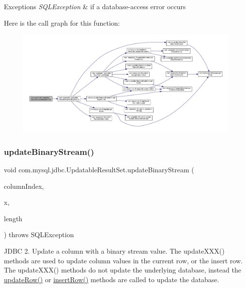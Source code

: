 \begin{DoxyExceptions}{Exceptions}
{\em S\+Q\+L\+Exception} & if a database-\/access error occurs \\
\hline
\end{DoxyExceptions}
Here is the call graph for this function\+:
\nopagebreak
\begin{figure}[H]
\begin{center}
\leavevmode
\includegraphics[width=350pt]{classcom_1_1mysql_1_1jdbc_1_1_updatable_result_set_acd7546dfd3c2aac7992447a458b3f9c8_cgraph}
\end{center}
\end{figure}
\mbox{\label{classcom_1_1mysql_1_1jdbc_1_1_updatable_result_set_a848439a6756f5600d13c02fb20ec8824}} 
\subsubsection{\texorpdfstring{update\+Binary\+Stream()}{updateBinaryStream()}\hspace{0.1cm}{\footnotesize\ttfamily [1/2]}}
{\footnotesize\ttfamily void com.\+mysql.\+jdbc.\+Updatable\+Result\+Set.\+update\+Binary\+Stream (\begin{DoxyParamCaption}\item[{int}]{column\+Index,  }\item[{java.\+io.\+Input\+Stream}]{x,  }\item[{int}]{length }\end{DoxyParamCaption}) throws S\+Q\+L\+Exception}

J\+D\+BC 2. Update a column with a binary stream value. The update\+X\+X\+X() methods are used to update column values in the current row, or the insert row. The update\+X\+X\+X() methods do not update the underlying database, instead the \mbox{\hyperlink{classcom_1_1mysql_1_1jdbc_1_1_updatable_result_set_a919969ba4b3c7cbc7b18605e9f31a746}{update\+Row()}} or \mbox{\hyperlink{classcom_1_1mysql_1_1jdbc_1_1_updatable_result_set_aef041f8d9d0778083716fc26652648fa}{insert\+Row()}} methods are called to update the database.



